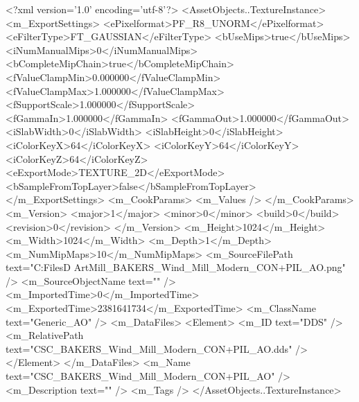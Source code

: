 <?xml version='1.0' encoding='utf-8'?>
<AssetObjects..TextureInstance>
  <m_ExportSettings>
    <ePixelformat>PF_R8_UNORM</ePixelformat>
    <eFilterType>FT_GAUSSIAN</eFilterType>
    <bUseMips>true</bUseMips>
    <iNumManualMips>0</iNumManualMips>
    <bCompleteMipChain>true</bCompleteMipChain>
    <fValueClampMin>0.000000</fValueClampMin>
    <fValueClampMax>1.000000</fValueClampMax>
    <fSupportScale>1.000000</fSupportScale>
    <fGammaIn>1.000000</fGammaIn>
    <fGammaOut>1.000000</fGammaOut>
    <iSlabWidth>0</iSlabWidth>
    <iSlabHeight>0</iSlabHeight>
    <iColorKeyX>64</iColorKeyX>
    <iColorKeyY>64</iColorKeyY>
    <iColorKeyZ>64</iColorKeyZ>
    <eExportMode>TEXTURE_2D</eExportMode>
    <bSampleFromTopLayer>false</bSampleFromTopLayer>
  </m_ExportSettings>
  <m_CookParams>
    <m_Values />
  </m_CookParams>
  <m_Version>
    <major>1</major>
    <minor>0</minor>
    <build>0</build>
    <revision>0</revision>
  </m_Version>
  <m_Height>1024</m_Height>
  <m_Width>1024</m_Width>
  <m_Depth>1</m_Depth>
  <m_NumMipMaps>10</m_NumMipMaps>
  <m_SourceFilePath text="C:\Users\Shadow\Desktop\Working Files\3D Art\BAKERS\Wind Mill\modern\textures\CSC_BAKERS_Wind_Mill_Modern_CON+PIL_AO.png" />
  <m_SourceObjectName text="" />
  <m_ImportedTime>0</m_ImportedTime>
  <m_ExportedTime>2381641734</m_ExportedTime>
  <m_ClassName text="Generic_AO" />
  <m_DataFiles>
    <Element>
      <m_ID text="DDS" />
      <m_RelativePath text="CSC_BAKERS_Wind_Mill_Modern_CON+PIL_AO.dds" />
    </Element>
  </m_DataFiles>
  <m_Name text="CSC_BAKERS_Wind_Mill_Modern_CON+PIL_AO" />
  <m_Description text="" />
  <m_Tags />
</AssetObjects..TextureInstance>